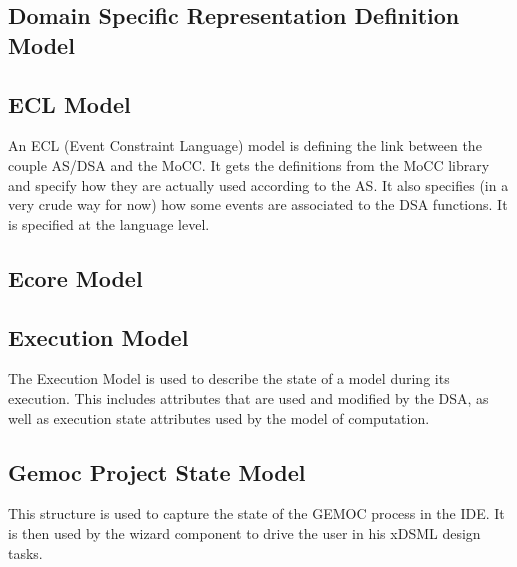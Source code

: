 \documentclass{gemoc} %
\begin{document}
\subsection{Domain Specific Representation Definition Model}
\label{sec:Domain_Specific_Representation_Definition_Model}


\subsection{ECL Model}
\label{sec:ECL_Model}
An ECL (Event Constraint Language) model is defining the link between the couple AS/DSA and the MoCC.
\newline It gets the definitions from the MoCC library and specify how they are actually used according to the AS. It also specifies (in a very crude way for now) how some events are associated to the DSA functions.
\newline It is specified at the language level.

\subsection{Ecore Model}
\label{sec:Ecore_Model}


\subsection{Execution Model}
\label{sec:Execution_Model}
The Execution Model is used to describe the state of a model during its execution. This includes attributes that are used and modified by the DSA, as well as execution state attributes used by the model of computation.

\subsection{Gemoc Project State Model}
\label{sec:Gemoc_Project_State_Model}
This structure is used to capture the state of the GEMOC process in the IDE. It is then used by the wizard component to drive the user in his xDSML design tasks.
\end{document}
